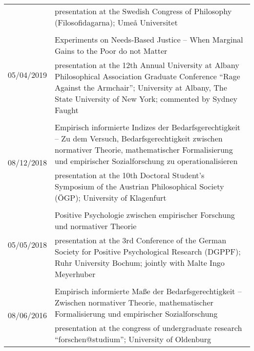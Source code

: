 \documentclass[a4paper,10pt]{article}
\begin{document}
\begin{longtable}{p{2.5cm}p{11cm}}
& \footnotesize{presentation at the Swedish Congress of Philosophy (Filosofidagarna); Umeå Universitet}\\
\\
\multirow{2}{2.5cm}{\footnotesize{05/04/2019}} & Experiments on Needs-Based Justice -- When Marginal Gains to the Poor do not Matter\\
& \footnotesize{presentation at the 12th Annual University at Albany Philosophical Association Graduate Conference \enquote{Rage Against the Armchair}; University at Albany, The State University of New York; commented by Sydney Faught}\\
\\
\multirow{2}{2.5cm}{\footnotesize{08/12/2018}} & Empirisch informierte Indizes der Bedarfsgerechtigkeit -- Zu dem Versuch, Bedarfsgerechtigkeit zwischen normativer Theorie, mathematischer Formalisierung und empirischer Sozialforschung zu operationalisieren\\
& \footnotesize{presentation at the 10th Doctoral Student's Symposium of the Austrian Philosophical Society (ÖGP); University of Klagenfurt}\\
\\
\multirow{2}{2.5cm}{\footnotesize{05/05/2018}} & Positive Psychologie zwischen empirischer Forschung und normativer Theorie\\
& \footnotesize{presentation at the 3rd Conference of the German Society for Positive Psychological Research (DGPPF); Ruhr University Bochum; jointly with Malte Ingo Meyerhuber}\\
\\
\multirow{2}{2.5cm}{\footnotesize{08/06/2016}} & Empirisch informierte Maße der Bedarfsgerechtigkeit -- Zwischen normativer Theorie, mathematischer Formalisierung und empirischer Sozialforschung\\
& \footnotesize{presentation at the congress of undergraduate research \enquote{forschen@studium}; University of Oldenburg}\\
\end{longtable}


\clearpage %
\end{document}
